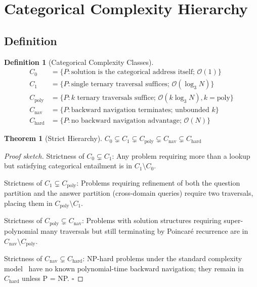 \documentclass[12pt,twocolumn]{article}
\newtheorem{theorem}{Theorem}[section]
\newtheorem{definition}{Definition}[section]
\begin{document}
\section{Categorical Complexity Hierarchy}
\label{sec:complexity}

\subsection{Definition}

\begin{definition}[Categorical Complexity Classes]
\begin{align}
C_0 &= \{P : \text{solution is the categorical address itself; } \mathcal{O}(1)\} \\
C_1 &= \{P : \text{single ternary traversal suffices; } \mathcal{O}(\log_3 N)\} \\
C_{\text{poly}} &= \{P : k \text{ ternary traversals suffice; } \mathcal{O}(k \log_3 N), k = \text{poly}\} \\
C_{\text{nav}} &= \{P : \text{backward navigation terminates; unbounded } k\} \\
C_{\text{hard}} &= \{P : \text{no backward navigation advantage; } \mathcal{O}(N)\}
\end{align}
\end{definition}

\begin{theorem}[Strict Hierarchy]
$C_0 \subsetneq C_1 \subsetneq C_{\text{poly}} \subsetneq C_{\text{nav}} \subsetneq C_{\text{hard}}$
\end{theorem}

\begin{proof}[Proof sketch]
Strictness of $C_0 \subsetneq C_1$: Any problem requiring more than a lookup but satisfying categorical entailment is in $C_1 \setminus C_0$.

Strictness of $C_1 \subsetneq C_{\text{poly}}$: Problems requiring refinement of both the question partition and the answer partition (cross-domain queries) require two traversals, placing them in $C_{\text{poly}} \setminus C_1$.

Strictness of $C_{\text{poly}} \subsetneq C_{\text{nav}}$: Problems with solution structures requiring super-polynomial many traversals but still terminating by Poincaré recurrence are in $C_{\text{nav}} \setminus C_{\text{poly}}$.

Strictness of $C_{\text{nav}} \subsetneq C_{\text{hard}}$: NP-hard problems under the standard complexity model~\cite{arora2009computational,sipser2012introduction} have no known polynomial-time backward navigation; they remain in $C_{\text{hard}}$ unless P = NP. $\square$
\end{proof}
\end{document}
